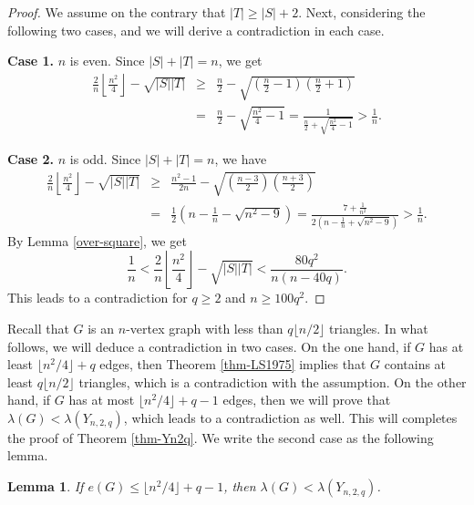 \documentclass[11pt]{article}
\newtheorem{lemma}[theorem]{Lemma}
\begin{document}
 \begin{proof}
  We assume on the contrary that $|T|\ge |S|+2$.
Next, considering the following two cases, 
and we will derive a contradiction in each case. 

\medskip 
 {\bf Case 1.} $n$ is even. Since $|S|+|T|=n$, we get
 \begin{eqnarray*}
  \frac{2}{n} \left \lfloor\frac{n^2}{4} \right \rfloor  
    -\sqrt{|S||T|} & \ge&  \frac{n}{2}-\sqrt{ \left (\frac{n}{2}-1 \right) \left(\frac{n}{2}+1 \right)}\\
&=&\frac{n}{2}-\sqrt{\frac{n^2}{4}-1}=\frac{1}{\frac{n}{2}+\sqrt{\frac{n^2}{4}-1}}>\frac{1}{n}.
  \end{eqnarray*}


 {\bf Case 2.} $n$ is odd. Since $|S|+|T|=n$, we  have
   \begin{eqnarray*}
    \frac{2}{n}\left \lfloor\frac{n^2}{4} \right \rfloor  
     -\sqrt{|S||T|}
    &\ge & \frac{n^2-1}{2n}-\sqrt{\left (\frac{n-3}{2} \right) \left(\frac{n+3}{2} \right)}\\
&=& \frac{1}{2}
\left( {n-\frac{1}{n}}-{\sqrt{n^2-9}}\right)  
= \frac{7+\frac{1}{n^2}}{2(n-\frac{1}{n}+\sqrt{n^2-9})}> \frac{1}{n}.
  \end{eqnarray*}
By Lemma \ref{over-square}, we get 
 $$\frac{1}{n}< \frac{2}{n} \left \lfloor\frac{n^2}{4} \right \rfloor   
  -\sqrt{|S||T|} <  \frac{80q^2}{n(n-40 q)} .
 $$
This leads to a contradiction for $q\ge 2 $ and $n\ge 100q^2$. 
\end{proof}




Recall that $G$ is an $n$-vertex graph 
with less than $ q \lfloor {n}/{2}\rfloor$ triangles. 
In what follows, 
we will deduce a contradiction in two cases. 
On the one hand, 
if  $G$ has at least $ \lfloor n^2/4\rfloor +q$ edges, then 
 Theorem \ref{thm-LS1975} implies that 
$G$ contains at least $q \lfloor {n}/{2}\rfloor$ triangles, 
which is a contradiction with the assumption. 
On the other hand, 
if $G$ has at most $  \lfloor n^2/4\rfloor +q -1$ edges, 
then we will prove that $\lambda (G) < \lambda (Y_{n,2,q})$, 
which leads to a contradiction as well. 
This will completes the proof of Theorem \ref{thm-Yn2q}. 
We write the second case as the following lemma. 


\begin{lemma} \label{lessYn2q}
If $e(G)\le  \lfloor n^2/4\rfloor +q -1$, then 
$\lambda (G)< \lambda (Y_{n,2,q})$. 
\end{lemma}
\end{document}
